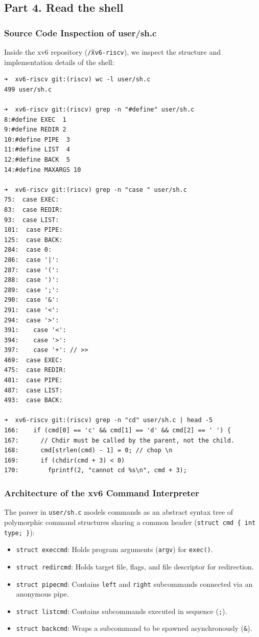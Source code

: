 \documentclass{labreport}
\begin{document}
\subsection{Part 4. Read the shell}

\subsubsection{Source Code Inspection of user/sh.c}
Inside the xv6 repository (\texttt{\~/xv6-riscv}), we inspect the structure and implementation details of the shell:

\begin{lstlisting}[style=bash]
➜  xv6-riscv git:(riscv) wc -l user/sh.c
499 user/sh.c

➜  xv6-riscv git:(riscv) grep -n "#define" user/sh.c
8:#define EXEC  1
9:#define REDIR 2
10:#define PIPE  3
11:#define LIST  4
12:#define BACK  5
14:#define MAXARGS 10

➜  xv6-riscv git:(riscv) grep -n "case " user/sh.c
75:  case EXEC:
83:  case REDIR:
93:  case LIST:
101:  case PIPE:
125:  case BACK:
284:  case 0:
286:  case '|':
287:  case '(':
288:  case ')':
289:  case ';':
290:  case '&':
291:  case '<':
294:  case '>':
391:    case '<':
394:    case '>':
397:    case '+': // >>
469:  case EXEC:
475:  case REDIR:
481:  case PIPE:
487:  case LIST:
493:  case BACK:

➜  xv6-riscv git:(riscv) grep -n "cd" user/sh.c | head -5
166:    if (cmd[0] == 'c' && cmd[1] == 'd' && cmd[2] == ' ') {
167:      // Chdir must be called by the parent, not the child.
168:      cmd[strlen(cmd) - 1] = 0; // chop \n
169:      if (chdir(cmd + 3) < 0)
170:        fprintf(2, "cannot cd %s\n", cmd + 3);
\end{lstlisting}

\subsubsection{Architecture of the xv6 Command Interpreter}
The parser in \texttt{user/sh.c} models commands as an abstract syntax tree of polymorphic command structures sharing a common header (\texttt{struct cmd \{ int type; \}}):
\begin{itemize}[noitemsep]
    \item \texttt{struct execcmd}: Holds program arguments (\texttt{argv}) for \texttt{exec()}.
    \item \texttt{struct redircmd}: Holds target file, flags, and file descriptor for redirection.
    \item \texttt{struct pipecmd}: Contains \texttt{left} and \texttt{right} subcommands connected via an anonymous pipe.
    \item \texttt{struct listcmd}: Contains subcommands executed in sequence (\texttt{;}).
    \item \texttt{struct backcmd}: Wraps a subcommand to be spawned asynchronously (\texttt{\&}).
\end{itemize}
\end{document}
